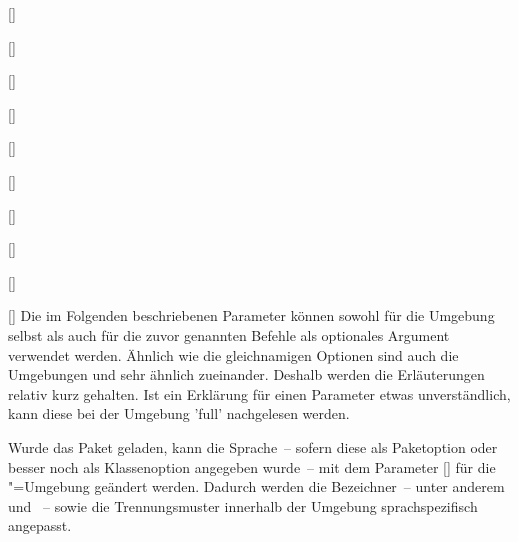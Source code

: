 \begin{Declaration}[v2.02]{[]}
\begin{Declaration}[v2.04]{%
}
\begin{Declaration}{[]}
\begin{Declaration}[v2.02]{%
  []%
}
\begin{Declaration}[v2.02]{%
  []%
}
\begin{Declaration}[v2.02]{%
  []%
}
\begin{Declaration}{[\PSet]}
\begin{Declaration}{%
  []
}
\begin{Declaration}{[]}
\begin{Declaration}{[]}
\begin{Declaration}{[]}
Die im Folgenden beschriebenen Parameter können sowohl für die Umgebung 
 selbst als auch für die zuvor genannten Befehle als 
optionales Argument verwendet werden. Ähnlich wie die gleichnamigen Optionen 
sind auch die Umgebungen  und  
sehr ähnlich zueinander. Deshalb werden die Erläuterungen relativ kurz 
gehalten. Ist ein Erklärung für einen Parameter etwas unverständlich, kann 
diese bei der Umgebung 'full' nachgelesen werden.

Wurde das Paket  geladen, kann die Sprache~-- sofern diese als 
Paketoption oder besser noch als Klassenoption angegeben wurde~-- mit dem 
Parameter [] für die 
"=Umgebung geändert werden. Dadurch werden die 
Bezeichner~-- unter anderem  und ~-- 
sowie die Trennungsmuster innerhalb der Umgebung sprachspezifisch angepasst. 


\end{Declaration}
\end{Declaration}
\end{Declaration}
\end{Declaration}
\end{Declaration}
\end{Declaration}
\end{Declaration}
\end{Declaration}
\end{Declaration}
\end{Declaration}
\end{Declaration}

